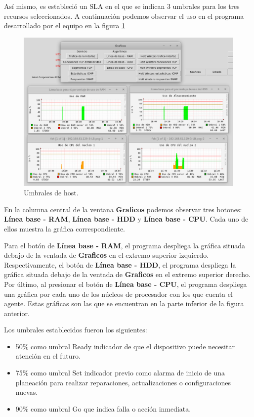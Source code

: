 Así mismo, es estableció un SLA en el que se indican 3 umbrales para los tres recursos seleccionados. A continuación podemos observar el uso en el programa desarrollado por el equipo en la figura \ref{image:umbrales}

\FloatBarrier
\begin{figure}[htbp!]
		\centering
			\includegraphics[width=.9 \textwidth]{images/umbrales}
		\caption{Umbrales de host.}
		\label{image:umbrales}
\end{figure}
\FloatBarrier

En la columna central de la ventana \textbf{Graficos} podemos observar tres botones: \textbf{Línea base - RAM}, \textbf{Línea base - HDD} y \textbf{Línea base - CPU}. Cada uno de ellos muestra la gráfica correspondiente.

Para el botón de \textbf{Línea base - RAM}, el programa despliega la gráfica situada debajo de la ventada de \textbf{Graficos} en el extremo superior izquierdo. Respectivamente, el botón de \textbf{Línea base - HDD}, el programa despliega la gráfica situada debajo de la ventada de \textbf{Graficos} en el extremo superior derecho. Por último, al presionar el botón de \textbf{Línea base - CPU}, el programa despliega una gráfica por cada uno de los núcleos de procesador con los que cuenta el agente. Estas gráficas son las que se encuentran en la parte inferior de la figura anterior.

Los umbrales establecidos fueron los siguientes:

\begin{itemize}
	\item 50\% como umbral Ready indicador de que el dispositivo puede necesitar atención en el futuro.
	\item 75\% como umbral Set indicador previo como alarma de inicio de una planeación para realizar reparaciones, actualizaciones o configuraciones nuevas.
	\item 90\% como umbral Go que indica falla o acción inmediata.
\end{itemize}

